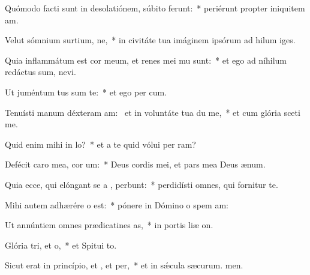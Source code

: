 \item Quómodo facti sunt in desolatiónem, súbito ferunt:~* periérunt propter iniquitem am.
\item Velut sómnium surtium, ne,~* in civitáte tua imáginem ipsórum ad hilum iges.
\item Quia inflammátum est cor meum, et renes mei mu sunt:~* et ego ad níhilum redáctus sum,  nevi.
\item Ut juméntum tus sum  te:~* et ego per cum.
\item Tenuísti manum déxteram am:~\pscross{} et in voluntáte tua du me,~* et cum glória sceti me.
\item Quid enim mihi  in lo?~* et a te quid vólui per ram?
\item Defécit caro mea,  cor um:~* Deus cordis mei, et pars mea Deus  ænum.
\item Quia ecce, qui elóngant se a , perbunt:~* perdidísti omnes, qui fornitur  te.
\item Mihi autem adhærére o  est:~* pónere in Dómino o spem am:
\item Ut annúntiem omnes prædicatines as,~* in portis liæ on.
\item Glória tri, et o,~* et Spitui to.
\item Sicut erat in princípio, et , et per,~* et in sǽcula sæcurum. men.
